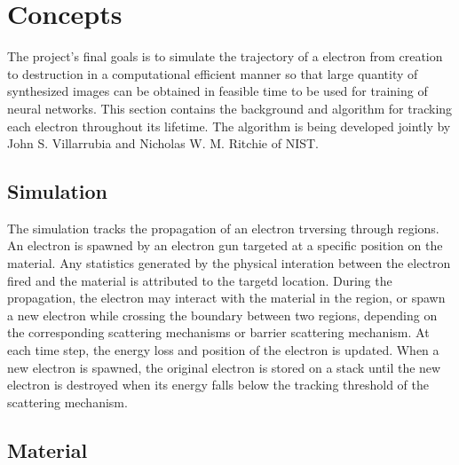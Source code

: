 \chapter{Concepts}
\label{sec:concepts}
The project's final goals is to simulate the trajectory of a electron from creation to destruction in a computational efficient manner so that large quantity of synthesized images can be obtained in feasible time to be used for training of neural networks. This section contains the background and algorithm for tracking each electron throughout its lifetime. The algorithm is being developed jointly by John S.  Villarrubia and Nicholas W. M. Ritchie of NIST.

\section{Simulation}\label{sec:concept_monte_carlo_ss}

The simulation tracks the propagation of an electron trversing through regions. An electron is spawned by an electron gun targeted at a specific position on the material. Any statistics generated by the physical interation between the electron fired and the material is attributed to the targetd location. During the propagation, the electron may interact with the material in the region, or spawn a new electron while crossing the boundary between two regions, depending on the corresponding scattering mechanisms or barrier scattering mechanism. At each time step, the energy loss and position of the electron is updated. When a new electron is spawned, the original electron is stored on a stack until the new electron is destroyed when its energy falls below the tracking threshold of the scattering mechanism.

\section{Material}\label{sec:concept_material}

